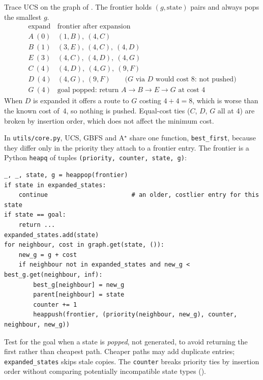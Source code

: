 \begin{workedexample}
Trace UCS on the graph of . The frontier holds $(g,\text{state})$ pairs and always pops the smallest $g$.
\[
\begin{array}{c|l}
\text{expand} & \text{frontier after expansion} \\
\hline
A\ (0) & (1,B),\ (4,C) \\
B\ (1) & (3,E),\ (4,C),\ (4,D) \\
E\ (3) & (4,C),\ (4,D),\ (4,G) \\
C\ (4) & (4,D),\ (4,G),\ (9,F) \\
D\ (4) & (4,G),\ (9,F) \qquad\text{($G$ via $D$ would cost 8: not pushed)} \\
G\ (4) & \text{goal popped: return } A\to B\to E\to G \text{ at cost } 4
\end{array}
\]
When $D$ is expanded it offers a route to $G$ costing $4+4=8$, which is worse than the known cost of~4, so nothing is pushed. Equal-cost ties ($C$, $D$, $G$ all at 4) are broken by insertion order, which does not affect the minimum cost.
\end{workedexample}

In \texttt{utils/core.py}, UCS, GBFS and A$^\star$ share one function, \texttt{best\_first}, because they differ only in the priority they attach to a frontier entry. The frontier is a Python \texttt{heapq} of tuples \texttt{(priority, counter, state, g)}:

\begin{lstlisting}[style=aipython]
_, _, state, g = heappop(frontier)
if state in expanded_states:
    continue                       # an older, costlier entry for this state
if state == goal:
    return ...
expanded_states.add(state)
for neighbour, cost in graph.get(state, ()):
    new_g = g + cost
    if neighbour not in expanded_states and new_g < best_g.get(neighbour, inf):
        best_g[neighbour] = new_g
        parent[neighbour] = state
        counter += 1
        heappush(frontier, (priority(neighbour, new_g), counter, neighbour, new_g))
\end{lstlisting}

Test for the goal when a state is \emph{popped}, not generated, to avoid returning the first rather than cheapest path. Cheaper paths may add duplicate entries; \texttt{expanded\_states} skips stale copies. The \texttt{counter} breaks priority ties by insertion order without comparing potentially incompatible state types ().


